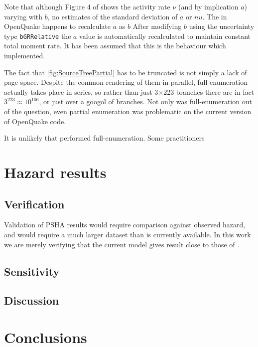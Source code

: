 \documentclass{article}
\begin{document}
Note that although Figure 4 of \cite{nath2012probabilistic} shows the activity rate $\nu$ (and by implication $a$) varying with $b$, no estimates of the standard deviation of $a$ or $nu$.
The  in OpenQuake happens to recalculate $a$ as $b$ After modifying $b$ using the uncertainty type \texttt{bGRRelative} the $a$ value is automatically recalculated to maintain constant total moment rate.
It has been assumed that this is the behaviour which \cite{nath2012probabilistic} implemented.

The fact that \autoref{fig:SourceTreePartial} has to be truncated is not simply a lack of page space.
Despite the common rendering of them in parallel, full enumeration actually takes place in series, so rather than just 3$\times$223 branches there are in fact $3^{223} \approx 10^106$, or just over a googol of branches.
Not only was full-enumeration out of the question, even partial enumeration was problematic on the current version of OpenQuake code.

It is unlikely that \cite{nath2012probabilistic} performed full-enumeration.
Some practitioners 

\section{Hazard results}
\label{sec:Results}

\subsection{Verification}
\label{subsec:Verification}

Validation of PSHA results would require comparison against observed hazard, and would require a much larger dataset than is currently available.
In this work we are merely verifying that the current model gives result close to those of \cite{nath2012probabilistic}.

\subsection{Sensitivity}
\label{subsec:Sensitivity}

\subsection{Discussion}
\label{subsec:Discussion}

\section{Conclusions}
\label{sec:Conclusions}
\end{document}

